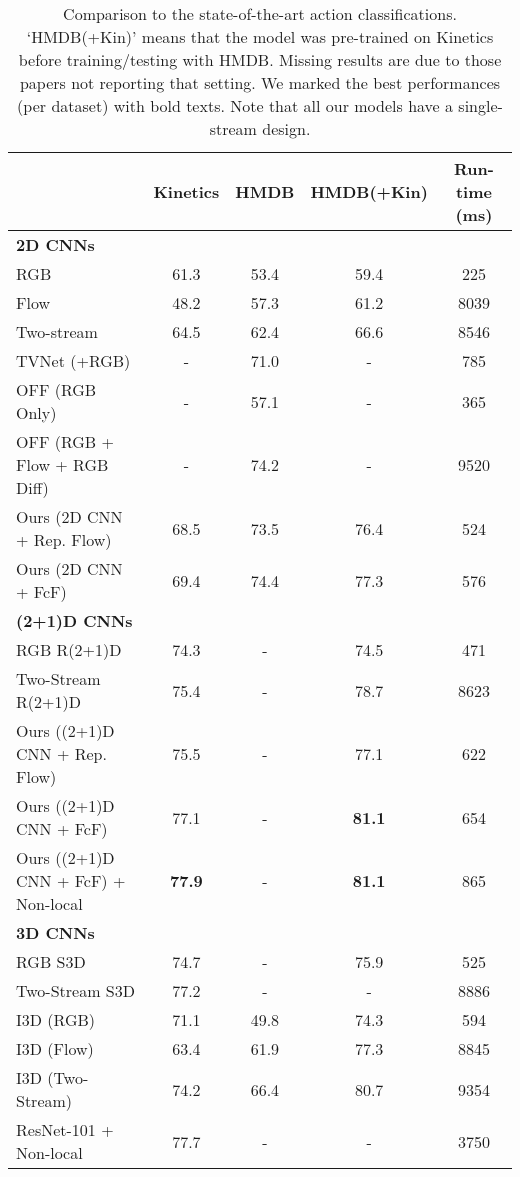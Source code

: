 \documentclass[10pt,twocolumn,letterpaper]{article}
\begin{document}
\begin{table*}
  \caption{Comparison to the state-of-the-art action classifications. `HMDB(+Kin)' means that the model was pre-trained on Kinetics before training/testing with HMDB. Missing results are due to those papers not reporting that setting. We marked the best performances (per dataset) with bold texts. Note that all our models have a single-stream design.}
  \label{tab:sota}
  \centering
  \begin{tabular}{lcccc}
    \toprule
                     &  Kinetics & HMDB & HMDB(+Kin) & Run-time (ms)  \\
    \midrule
    \textbf{2D CNNs}\\
    RGB               & 61.3     & 53.4 &    59.4    & 225  \\
    Flow              & 48.2     & 57.3 &    61.2    & 8039  \\
    Two-stream        & 64.5     & 62.4 &    66.6    & 8546  \\
    TVNet (+RGB) \cite{fan2018end}     & -    &  71.0 & - & 785  \\
    OFF (RGB Only) \cite{sun2018optical}     & -    &  57.1 & - & 365  \\
    OFF (RGB + Flow + RGB Diff) \cite{sun2018optical}     & -    &  74.2 & - & 9520  \\
    Ours (2D CNN + Rep. Flow)      & 68.5 &  73.5 & 76.4 & 524  \\
    Ours (2D CNN + FcF)        & 69.4 &  74.4 & 77.3 & 576  \\
    \midrule
    \textbf{(2+1)D CNNs} \\
RGB R(2+1)D \cite{tran2018closer}        & 74.3 & -  & 74.5  & 471  \\
    Two-Stream R(2+1)D \cite{tran2018closer} & 75.4 & -  & 78.7  & 8623  \\
    Ours ((2+1)D CNN + Rep. Flow)    & 75.5 & -     & 77.1 & 622  \\
    Ours ((2+1)D CNN + FcF)    & 77.1 & -     & \textbf{81.1} & 654  \\
    Ours ((2+1)D CNN + FcF) + Non-local   & \textbf{77.9} & -     & \textbf{81.1} & 865  \\
    \midrule
    \textbf{3D CNNs} \\
    RGB S3D \cite{xie2017rethinking}         & 74.7 & -   &  75.9 & 525  \\
    Two-Stream S3D \cite{xie2017rethinking}  & 77.2 & -   &  -   & 8886   \\
    I3D (RGB)  \cite{carreira2017quo}       & 71.1 & 49.8  & 74.3 & 594   \\
    I3D (Flow)        & 63.4 & 61.9 & 77.3 & 8845   \\
    I3D (Two-Stream)    & 74.2 & 66.4 & 80.7 & 9354   \\
    ResNet-101 + Non-local \cite{wang2017non} & 77.7 & - & - & 3750 \\
    \bottomrule
  \end{tabular}
\end{table*}
\end{document}

